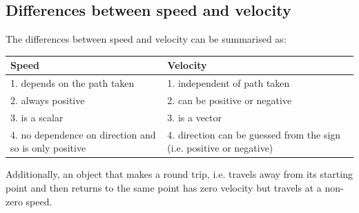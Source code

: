             \subsection*{Differences between speed and velocity}
            \nopagebreak
        \label{m38791*id66482}The differences between speed and velocity can be summarised as:\par 
\begin{center}
\begin{tabular}{|p{5cm}|p{5cm}|}\hline
\textbf{Speed} & \textbf{Velocity} \\\hline
1. depends on the path taken & 1. independent of path taken \\\hline
2. always positive & 2. can be positive or negative \\\hline
3. is a scalar & 3. is a vector \\\hline
4. no dependence on direction and so is only positive & 4. direction can be guessed from the sign (i.e. positive or negative) \\\hline
\end{tabular}
\end{center}
    \par
        \label{m38791*id66611}Additionally, an object that makes a round trip, i.e. travels away from its starting point and then returns to the same point has zero velocity but travels at a non-zero speed.\par 
\label{m38791*secfhsst!!!underscore!!!id1252}
